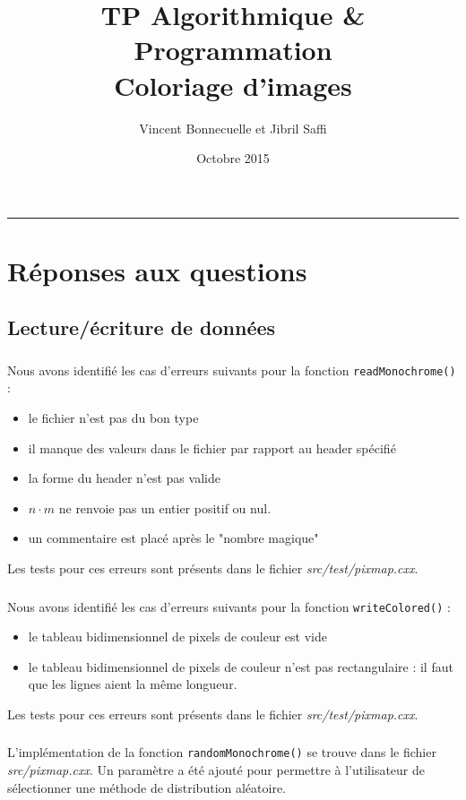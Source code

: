 \documentclass[10pt,a4paper]{article}
\title{\textbf{TP Algorithmique \& Programmation} \\ Coloriage d'images}
\author{Vincent Bonnecuelle et Jibril Saffi}
\date{Octobre 2015}
\begin{document}
\maketitle
\hrule
\section*{Réponses aux questions}
\subsection{Lecture/écriture de données}
\subsubsection{} 
Nous avons identifié les cas d'erreurs suivants pour la fonction \texttt{readMonochrome()} :
\begin{itemize}
\item le fichier n'est pas du bon type
\item il manque des valeurs dans le fichier par rapport au header spécifié
\item la forme du header n'est pas valide 
\item $n \cdot m$ ne renvoie pas un entier positif ou nul.
\item un commentaire est placé après le "nombre magique"
\end{itemize}
Les tests pour ces erreurs sont présents dans le fichier \textit{src/test/pixmap.cxx}.

\subsubsection{} 
Nous avons identifié les cas d'erreurs suivants pour la fonction \texttt{writeColored()} :
\begin{itemize}
\item le tableau bidimensionnel de pixels de couleur est vide
\item le tableau bidimensionnel de pixels de couleur n'est pas rectangulaire : il faut que les lignes aient la même longueur.
\end{itemize}
Les tests pour ces erreurs sont présents dans le fichier \textit{src/test/pixmap.cxx}.

\subsubsection{}
L'implémentation de la fonction \texttt{randomMonochrome()} se trouve dans le fichier \textit{src/pixmap.cxx}. Un paramètre a été ajouté pour permettre à l'utilisateur de sélectionner une méthode de distribution aléatoire.
\end{document}
